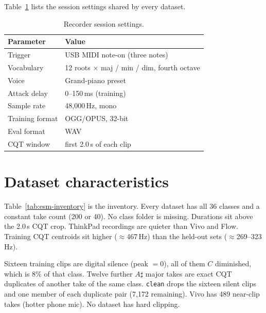 \documentclass[pdflatex,sn-mathphys-num]{sn-jnl}
\begin{document}
Table~\ref{tab:esm-session} lists the session settings shared by every dataset.

\begin{table}[t]
\caption{Recorder session settings.}\label{tab:esm-session}
\begin{tabular}{@{}ll@{}}
\toprule
Parameter & Value \\
\midrule
Trigger & USB MIDI note-on (three notes) \\
Vocabulary & 12 roots $\times$ maj / min / dim, fourth octave \\
Voice & Grand-piano preset \\
Attack delay & 0--150\,ms (training) \\
Sample rate & 48{,}000\,Hz, mono \\
Training format & OGG/OPUS, 32-bit \\
Eval format & WAV \\
CQT window & first 2.0\,s of each clip \\
\bottomrule
\end{tabular}
\end{table}

\section{Dataset characteristics}\label{sec:datasets}

Table~\ref{tab:esm-inventory} is the inventory. Every dataset has all 36 classes and a constant take count (200 or 40). No class folder is missing. Durations sit above the 2.0\,s CQT crop. ThinkPad recordings are quieter than Vivo and Flow. Training CQT centroids sit higher ($\approx$467\,Hz) than the held-out sets ($\approx$269--323\,Hz).

Sixteen training clips are digital silence (peak $=0$), all of them $C$ diminished, which is 8\% of that class. Twelve further $A\sharp$ major takes are exact CQT duplicates of another take of the same class. \texttt{clean} drops the sixteen silent clips and one member of each duplicate pair (7{,}172 remaining). Vivo has 489 near-clip takes (hotter phone mic). No dataset has hard clipping.
\end{document}
